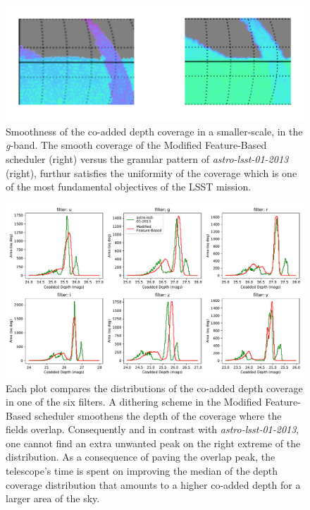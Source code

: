 \documentclass[11pt]{article}
\theoremstyle{definition}
\begin{document}
\begin{figure}[h!]
\centering
\includegraphics[width=0.5\linewidth]{Figures/ZoominG}
\caption{Smoothness of the co-added depth coverage in a smaller-scale, in the \textit{g}-band. The smooth coverage of the Modified Feature-Based scheduler (right) versus the granular pattern of \textit{astro-lsst-01-2013} (right), furthur satisfies the uniformity of the coverage which is one of the most fundamental objectives of the LSST mission.}
\label{fig_zoomin_g}
\end{figure}
\begin{figure}[h!]
\centering
\includegraphics[width=1.0\linewidth]{Figures/Co_addedHist10yrs.pdf}
\caption{Each plot compares the distributions of the co-added depth coverage in one of the six filters. A dithering scheme in the Modified Feature-Based scheduler smoothens the depth of the coverage where the fields overlap. Consequently and in contrast with \textit{astro-lsst-01-2013}, one cannot find an extra unwanted peak on the right extreme of the distribution. As a consequence of paving the overlap peak, the telescope's time is spent on improving the median of the depth coverage distribution that amounts to a higher co-added depth for a larger area of the sky.}
\label{fig_10yrs_hist}
\end{figure}
\end{document}
